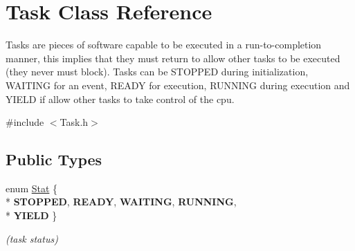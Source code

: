 \hypertarget{class_task}{\section{Task Class Reference}
\label{class_task}
}


Tasks are pieces of software capable to be executed in a run-\/to-\/completion manner, this implies that they must return to allow other tasks to be executed (they never must block). Tasks can be S\-T\-O\-P\-P\-E\-D during initialization, W\-A\-I\-T\-I\-N\-G for an event, R\-E\-A\-D\-Y for execution, R\-U\-N\-N\-I\-N\-G during execution and Y\-I\-E\-L\-D if allow other tasks to take control of the cpu.  




{\ttfamily \#include $<$Task.\-h$>$}

\subsection*{Public Types}
\begin{DoxyCompactItemize}
\item 
enum \hyperlink{class_task_a73d48a91578f634b3b191e4d63684e72}{Stat} \{ \\*
{\bfseries S\-T\-O\-P\-P\-E\-D}, 
{\bfseries R\-E\-A\-D\-Y}, 
{\bfseries W\-A\-I\-T\-I\-N\-G}, 
{\bfseries R\-U\-N\-N\-I\-N\-G}, 
\\*
{\bfseries Y\-I\-E\-L\-D}
 \}
\begin{DoxyCompactList}\small\item\em (task status) \end{DoxyCompactList}\end{DoxyCompactItemize}
